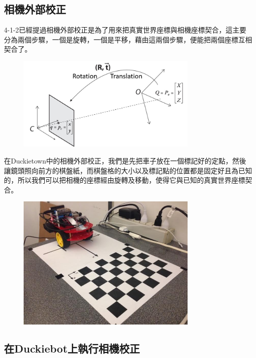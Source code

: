 \documentclass{article}
\begin{document}
\subsection{相機外部校正}

4-1-2已經提過相機外部校正是為了用來把真實世界座標與相機座標契合，這主要分為兩個步驟，一個是旋轉，一個是平移，藉由這兩個步驟，便能把兩個座標互相契合了。
\\
\begin{figure}[htp]
    \begin{center}
        \includegraphics[width=250pt]{pic/圖片13.jpg}
    \end{center}
\end{figure}

在Duckietown中的相機外部校正，我們是先把車子放在一個標記好的定點，然後讓鏡頭照向前方的棋盤紙，而棋盤格的大小以及標記點的位置都是固定好且為已知的，所以我們可以把相機的座標經由旋轉及移動，使得它與已知的真實世界座標契合。
\\
\begin{figure}[htp]
    \begin{center}
        \includegraphics[width=250pt]{pic/圖片14.jpg}
    \end{center}
\end{figure}

\subsection{在Duckiebot上執行相機校正}
\end{document}

